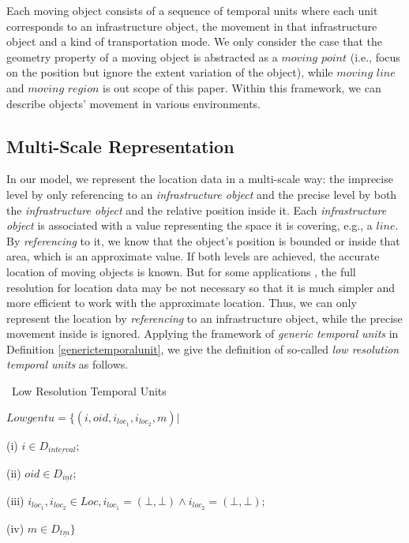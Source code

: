 Each moving object consists of a sequence of temporal units where each unit corresponds to an infrastructure object, the movement in that infrastructure 
object and a kind of transportation mode. 
We only consider the case that the geometry property of a moving 
object is abstracted as a $moving$ $point$ (i.e., focus on the position but ignore the 
extent variation of the object), while $moving$ $line$ and $moving$ $region$ is out scope 
of this paper. Within this framework, we can describe objects' movement in various 
environments. 

\subsection{Multi-Scale Representation}
\label{sec:multi-scaleresolution}
In our model, we represent the location data in a multi-scale way: the imprecise level
by only referencing to an \textit{infrastructure object} and the precise level by both the 
\textit{infrastructure object} and the relative position inside it. 
Each \textit{infrastructure object} is associated with a value representing the space 
it is covering, e.g., a $line$. By \textit{referencing} to it, we know that the object's position is
bounded or inside that area, which is an approximate value. If both levels are achieved, 
the accurate location of moving objects is known. But for some applications 
\cite{MRS05,MR05}, the full resolution for location data may be not necessary so that it 
is much simpler and more efficient to work with the approximate location. 
Thus, we can only represent the location by \textit{referencing} to an infrastructure object, 
while the precise movement inside is ignored. Applying the framework of \textit{generic temporal units} in Definition \ref{generictemporalunit}, we give the definition of so-called \textit{low resolution temporal units} as follows. 

\begin{Statement}
\label{lowresolutionunit}
\ Low Resolution Temporal Units

$Lowgentu=\{(i,oid,i_{loc_1},i_{loc_2}, m)|$

(i) $i \in D_{\underline{interval}}$;

(ii) $oid \in D_{\underline{int}}$;
 
(iii) $i_{loc_1},i_{loc_2} \in Loc, i_{loc_1}=(\bot,\bot) \wedge i_{loc_2}=(\bot,\bot)$;

(iv) $m \in D_{\underline{tm}}\}$

\end{Statement}

